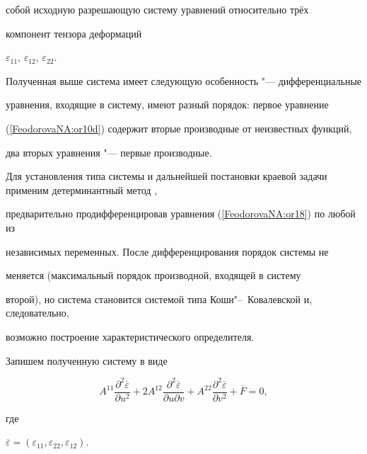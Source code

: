 собой исходную разрешающую систему уравнений относительно трёх

компонент тензора деформаций

$\varepsilon_{11}$, $\varepsilon_{12}$, $\varepsilon_{22}.$



\smallskip




Полученная выше система имеет следующую особенность "---  дифференциальные

уравнения, входящие в систему, имеют разный порядок: первое уравнение

(\ref{FeodorovaNA:or10d}) содержит вторые производные от неизвестных функций,

два вторых уравнения "--- первые производные.



 Для установления типа системы и дальнейшей постановки краевой задачи применим детерминантный метод \cite{FeodorovaNA:pet, FeodorovaNA:Bi2},

предварительно продифференцировав уравнения (\ref{FeodorovaNA:or18}) по любой из

независимых переменных. После дифференцирования порядок системы не

меняется (максимальный порядок производной, входящей в систему

второй), но система становится системой типа Коши"--~Ковалевской  \cite{FeodorovaNA:Bi1} и, следовательно,

возможно построение характеристического определителя.

 Запишем полученную систему в виде

\begin{equation}

\label{FeodorovaNA:or7x}

 A^{11}\frac{\partial^2\overline{\varepsilon}}{\partial u^2}+

2A^{12}\frac{\partial^2\overline{\varepsilon}}{\partial u \partial v}+

A^{22}\frac{\partial^2\overline{\varepsilon}}{\partial v^2}+\overline{F}=0,

\end{equation}

где

$\overline{\varepsilon}=(\varepsilon_{11}, \varepsilon_{22}, \varepsilon_{12}).$

